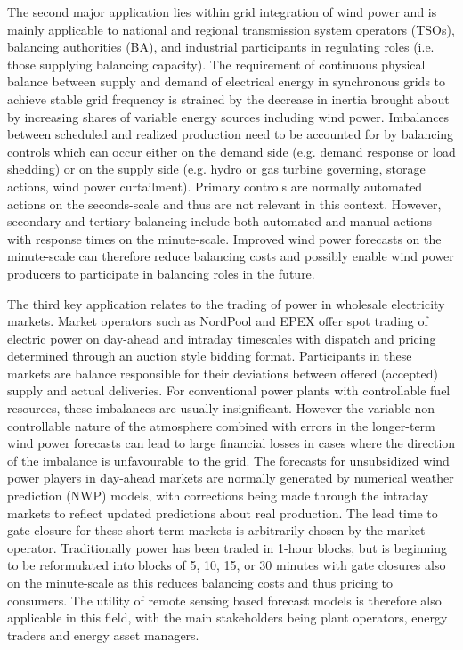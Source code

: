 The second major application lies within grid integration of wind power and is mainly applicable to national and regional transmission system operators (TSOs), balancing authorities (BA), and industrial participants in regulating roles (i.e. those supplying balancing capacity). The requirement of continuous physical balance between supply and demand of electrical energy in synchronous grids to achieve stable grid frequency is strained by the decrease in inertia brought about by increasing shares of variable energy sources including wind power. Imbalances between scheduled and realized production need to be accounted for by balancing controls which can occur either on the demand side (e.g. demand response or load shedding) or on the supply side (e.g. hydro or gas turbine governing, storage actions, wind power curtailment). Primary controls are normally automated actions on the seconds-scale and thus are not relevant in this context. However, secondary and tertiary balancing include both automated and manual actions with response times on the minute-scale. Improved wind power forecasts on the minute-scale can therefore reduce balancing costs and possibly enable wind power producers to participate in balancing roles in the future.

The third key application relates to the trading of power in wholesale electricity markets. Market operators such as NordPool and EPEX offer spot trading of electric power on day-ahead and intraday timescales with dispatch and pricing determined through an auction style bidding format. Participants in these markets are balance responsible for their deviations between offered (accepted) supply and actual deliveries. For conventional power plants with controllable fuel resources, these imbalances are usually insignificant. However the variable non-controllable nature of the atmosphere combined with errors in the longer-term wind power forecasts can lead to large financial losses in cases where the direction of the imbalance is unfavourable to the grid. The forecasts for unsubsidized wind power players in day-ahead markets are normally generated by numerical weather prediction (NWP) models, with corrections being made through the intraday markets to reflect updated predictions about real production. The lead time to gate closure for these short term markets is arbitrarily chosen by the market operator. Traditionally power has been traded in 1-hour blocks, but is beginning to be reformulated into blocks of 5, 10, 15, or 30 minutes with gate closures also on the minute-scale as this reduces balancing costs and thus pricing to consumers. The utility of remote sensing based forecast models is therefore also applicable in this field, with the main stakeholders being plant operators, energy traders and energy asset managers.

